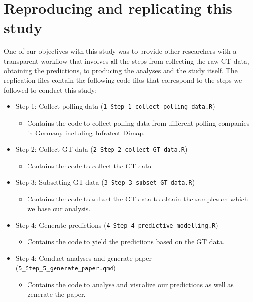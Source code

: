 \documentclass[
  letterpaper,
  DIV=11,
  numbers=noendperiod]{scrartcl}
\providecommand{\tightlist}{%
  \setlength{\itemsep}{0pt}\setlength{\parskip}{0pt}}\usepackage{longtable,booktabs,array}
\begin{document}
\hypertarget{reproducing-and-replicating-this-study}{%
\section{Reproducing and replicating this
study}\label{reproducing-and-replicating-this-study}}

One of our objectives with this study was to provide other researchers
with a transparent workflow that involves all the steps from collecting
the raw GT data, obtaining the predictions, to producing the analyses
and the study itself. The replication files contain the following code
files that correspond to the steps we followed to conduct this study:

\begin{itemize}
\tightlist
\item
  Step 1: Collect polling data
  (\texttt{1\_Step\_1\_collect\_polling\_data.R})

  \begin{itemize}
  \tightlist
  \item
    Contains the code to collect polling data from different polling
    companies in Germany including Infratest Dimap.
  \end{itemize}
\item
  Step 2: Collect GT data (\texttt{2\_Step\_2\_collect\_GT\_data.R})

  \begin{itemize}
  \tightlist
  \item
    Contains the code to collect the GT data.
  \end{itemize}
\item
  Step 3: Subsetting GT data (\texttt{3\_Step\_3\_subset\_GT\_data.R})

  \begin{itemize}
  \tightlist
  \item
    Contains the code to subset the GT data to obtain the samples on
    which we base our analysis.
  \end{itemize}
\item
  Step 4: Generate predictions
  (\texttt{4\_Step\_4\_predictive\_modelling.R})

  \begin{itemize}
  \tightlist
  \item
    Contains the code to yield the predictions based on the GT data.
  \end{itemize}
\item
  Step 4: Conduct analyses and generate paper
  (\texttt{5\_Step\_5\_generate\_paper.qmd})

  \begin{itemize}
  \tightlist
  \item
    Contains the code to analyse and visualize our predictions as well
    as generate the paper.
  \end{itemize}
\end{itemize}
\end{document}
